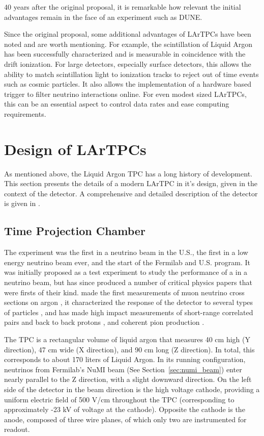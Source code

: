 40 years after the original proposal, it is remarkable how relevant the initial advantages remain in the face of an experiment such as DUNE. 

Since the original proposal, some additional advantages of LArTPCs have been noted and are worth mentioning.  For example, the scintillation of Liquid Argon has been successfully characterized \cite{Heindl:2010zz} and is measurable in coincidence with the drift ionization.  For large detectors, especially surface detectors, this allows the ability to match scintillation light to ionization tracks to reject out of time events such as cosmic particles.  It also allows the implementation of a hardware based trigger to filter neutrino interactions online.  For even modest sized LArTPCs, this can be an essential aspect to control data rates and ease computing requirements.

\section{Design of LArTPCs}
\label{sec:argoneut_detector}

As mentioned above, the Liquid Argon TPC has a long history of development.  This section presents the details of a modern LArTPC in it's design, given in the context of the \argoneut detector. A comprehensive and detailed description of the \argoneut detector is given in \cite{Anderson:2012vc}.

\subsection{\argoneut Time Projection Chamber}

The \argoneut experiment was the first \lartpc in a neutrino beam in the U.S., the first \lartpc in a low energy neutrino beam ever, and the start of the Fermilab and U.S. \lartpc program.  It was initially proposed as a test experiment to study the performance of a \lartpc in a neutrino beam, but has since produced a number of critical physics papers that were firsts of their kind.  \argoneut made the first measurements of muon neutrino cross sections on argon \cite{Anderson:2011ce, Acciarri:2014isz}, it characterized the response of the detector to several types of particles \cite{Anderson:2012mra, Acciarri:2013met}, and has made high impact measurements of short-range correlated pairs and back to back protons \cite{Acciarri:2014gev}, and coherent pion production \cite{Acciarri:2014eit}.

The \argoneut TPC is a rectangular volume of liquid argon that measures 40 cm high (Y direction), 47 cm wide (X direction), and 90 cm long (Z direction).  In total, this corresponds to about 170 liters of Liquid Argon.  In its running configuration, neutrinos from Fermilab's NuMI beam (See Section~\ref{sec:numi_beam}) enter nearly parallel to the Z direction, with a slight downward direction.  On the left side of the detector in the beam direction is the high voltage cathode, providing a uniform electric field of 500 V/cm throughout the TPC (corresponding to approximately -23 kV of voltage at the cathode).  Opposite the cathode is the anode, composed of three wire planes, of which only two are instrumented for readout.

